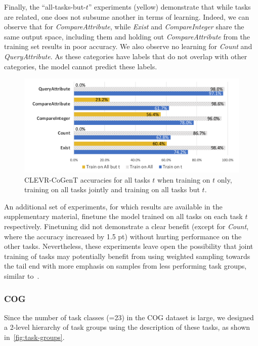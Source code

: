 Finally, the ``all-tasks-but-$t$'' experiments (yellow) demonstrate that while tasks are related, one does not subsume another in terms of learning. Indeed, we can observe that for \textit{CompareAttribute}, while \textit{Exist} and \textit{CompareInteger} share the same output space, including them and holding out \textit{CompareAttribute} from the training set results in poor accuracy.
We also observe no learning for \textit{Count} and \textit{QueryAttribute}. As these categories have labels that do not overlap with other categories, the model cannot predict these labels.


\begin{figure}[!t]
	\centering
	\includegraphics[width=\columnwidth]{img/results/CoGenT_results.pdf}
	\caption{CLEVR-CoGenT accuracies for all tasks $t$ when training on $t$ only, training on all tasks jointly and training on all tasks but $t$.} %
	\label{fig:CoGenT-results}
\end{figure}

An additional set of experiments, for which results are available in the supplementary material,
finetune the model trained on all tasks on each task $t$ respectively.
Finetuning did not demonstrate a clear benefit (except for \textit{Count}, where the accuracy increased by 1.5 pt) without hurting performance on the other tasks. Nevertheless, these experiments leave open the possibility that joint training of tasks may potentially benefit from using weighted sampling towards the tail end with more emphasis on samples from less performing task groups, similar to~\cite{guo2018dynamic, kendall2018multi}.

\subsubsection{COG}
\label{sec:reasoning-cog}
Since the number of task classes (=23) in the COG dataset is large, we designed a 2-level hierarchy of task groups using the
description of these tasks, as shown in~\cref{fig:task-groups}.

